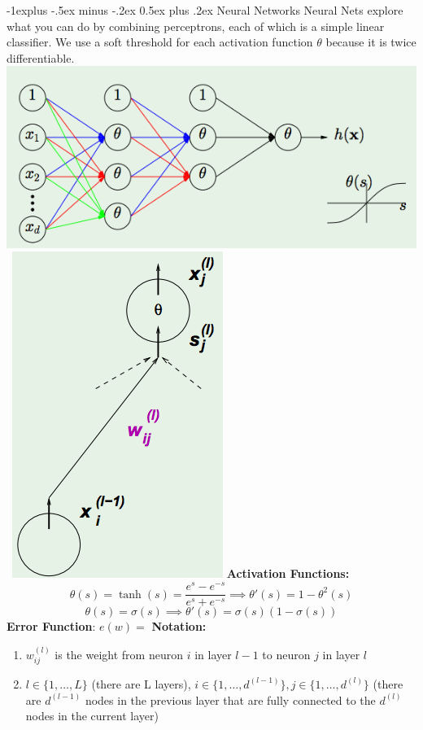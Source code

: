 \documentclass[3pt,landscape]{article}
\makeatletter
\renewcommand{\subsection}{\@startsection{subsection}{2}{0mm}%
                            {-1explus -.5ex minus -.2ex}%
                            {0.5ex plus .2ex}%
                            {\normalfont\normalsize\bfseries}}
\makeatother
\begin{document}
\begin{multicols}{3}
\subsection{Neural Networks}
Neural Nets explore what you can do by combining perceptrons, each of which is a simple linear classifier. We use a soft threshold for each activation function $\theta$ because it is twice differentiable.
\includegraphics[scale=0.31]{NN.pdf} \ \includegraphics[scale=0.2]{NN2.pdf}
{\bf Activation Functions:}
\[\theta(s) = \operatorname{tanh}(s) = \frac{e^s-e^{-s}}{e^s+e^{-s}} \implies \theta'(s) = 1 - \theta^2(s)\]
\[\theta(s) = \sigma(s) \implies \theta'(s) = \sigma(s)(1-\sigma(s))\]
{\bf Error Function}:
\(e(w) = \)
{\bf Notation:}
\begin{enumerate}
\item $w_{ij}^{(l)}$ is the weight from neuron $i$ in layer $l-1$ to neuron $j$ in layer $l$
\item $l \in \{1,\ldots,L\}$ (there are L layers), $i \in \{1,\ldots,d^{(l-1)}\}, j \in \{1,\ldots,d^{(l)}\}$ (there are $d^{(l-1)}$ nodes in the previous layer that are fully connected to the $d^{(l)}$ nodes in the current layer)

\end{enumerate}
\end{multicols}
\end{document}
